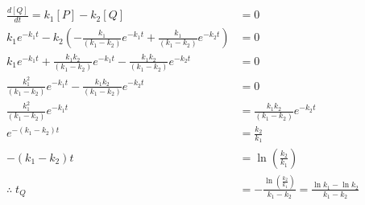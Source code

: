 \begin{solution}
\begin{align*}
\frac{d[Q]}{dt} = k_1[P] - k_2[Q] &= 0 \\
k_1e^{-k_1 t} - k_2(-\frac{k_1}{(k_1-k_2)}e^{-k_1 t} + \frac{k_1}{(k_1-k_2)}e^{-k_2t}) &= 0 \\
k_1e^{-k_1 t} + \frac{k_1k_2}{(k_1-k_2)}e^{-k_1 t} - \frac{k_1k_2}{(k_1-k_2)}e^{-k_2t} &= 0 \\
\frac{k_1^2}{(k_1-k_2)}e^{-k_1 t} - \frac{k_1k_2}{(k_1-k_2)}e^{-k_2t} &= 0 \\
\frac{k_1^2}{(k_1-k_2)}e^{-k_1 t} &= \frac{k_1k_2}{(k_1-k_2)}e^{-k_2t} \\
e^{-(k_1-k_2)t} &= \frac{k_2}{k_1} \\
-(k_1-k_2)t &= \ln\left(\frac{k_2}{k_1}\right) \\
\therefore \; t_Q &= -\frac{\ln(\frac{k_2}{k_1})}{k_1 - k_2} = \frac{\ln k_1 - \ln k_2}{k_1 - k_2}
\end{align*}
\end{solution}

